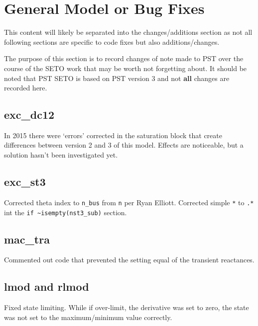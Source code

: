 \chapter{General Model or Bug Fixes}

This content will likely be separated into the changes/additions section as not all following sections are specific to code fixes but also additions/changes.

The purpose of this section is to record changes of note made to PST over the course of the SETO work that may be worth not forgetting about.
It should be noted that PST SETO is based on PST version 3 and not \textbf{all} changes are recorded here.


\section{exc\_dc12}  
In 2015 there were `errors' corrected in the saturation block that create differences between version 2 and 3 of this model.
Effects are noticeable, but a solution hasn't been investigated yet.

\section{exc\_st3}  
Corrected theta index to \verb|n_bus| from \verb|n| per Ryan Elliott.
Corrected simple \verb|*| to \verb|.*| int the \verb|if ~isempty(nst3_sub)| section.

\section{mac\_tra}  
Commented out code that prevented the setting equal of the transient reactances.

\section{lmod and rlmod}  
Fixed state limiting.
 While if over-limit, the derivative was set to zero, the state was not set to the maximum/minimum value correctly.


